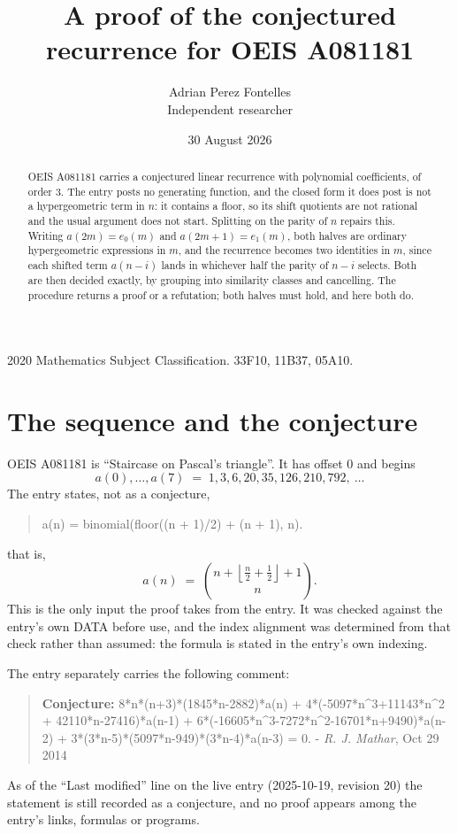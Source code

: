 \documentclass[11pt,a4paper]{article}
\title{A proof of the conjectured recurrence for OEIS A081181}
\author{Adrian Perez Fontelles\\ \small Independent researcher}
\date{30 August 2026}
\theoremstyle{plain}
\theoremstyle{definition}
\begin{document}
\maketitle

\begin{abstract}
OEIS A081181 carries a conjectured linear recurrence with polynomial coefficients, of
order 3. The entry posts no generating function, and the closed form it does post
is not a hypergeometric term in $n$: it contains a floor, so its shift quotients are not
rational and the usual argument does not start. Splitting on the parity of $n$ repairs
this. Writing $a(2m)=e_{0}(m)$ and $a(2m+1)=e_{1}(m)$, both halves are ordinary
hypergeometric expressions in $m$, and the recurrence becomes two identities in $m$, since
each shifted term $a(n-i)$ lands in whichever half the parity of $n-i$ selects. Both are
then decided exactly, by grouping into similarity classes and cancelling. The procedure
returns a proof or a refutation; both halves must hold, and here both do.
\end{abstract}

\noindent\small 2020 Mathematics Subject Classification. 33F10, 11B37, 05A10.\normalsize

\section{The sequence and the conjecture}

OEIS A081181 is ``Staircase on Pascal's triangle''. It has offset $0$ and begins
\[
a(0),\dots,a(7)\;=\;1, 3, 6, 20, 35, 126, 210, 792,\ \dots
\]
The entry states, not as a conjecture,
\begin{quote}\small
a(n) = binomial(floor((n + 1)/2) + (n + 1), n).
\end{quote}
that is,
\begin{equation}\label{eq:cf}
a(n)\;=\;{\binom{n + \left\lfloor{\frac{n}{2} + \frac{1}{2}}\right\rfloor + 1}{n}} .
\end{equation}
This is the only input the proof takes from the entry. It was checked against the entry's
own DATA before use, and the index alignment was determined from that check rather than
assumed: the formula is stated in the entry's own indexing.

The entry separately carries the following comment:
\begin{quote}\small
\textbf{Conjecture:} 8*n*(n+3)*(1845*n-2882)*a(n) + 4*(-5097*n\^{}3+11143*n\^{}2 + 42110*n-27416)*a(n-1) + 6*(-16605*n\^{}3-7272*n\^{}2-16701*n+9490)*a(n-2) + 3*(3*n-5)*(5097*n-949)*(3*n-4)*a(n-3) = 0. - \emph{R. J. Mathar}, Oct 29 2014
\end{quote}
As of the ``Last modified'' line on the live entry (2025-10-19, revision 20) the
statement is still recorded as a conjecture, and no proof appears among the entry's links,
formulas or programs.
\end{document}
